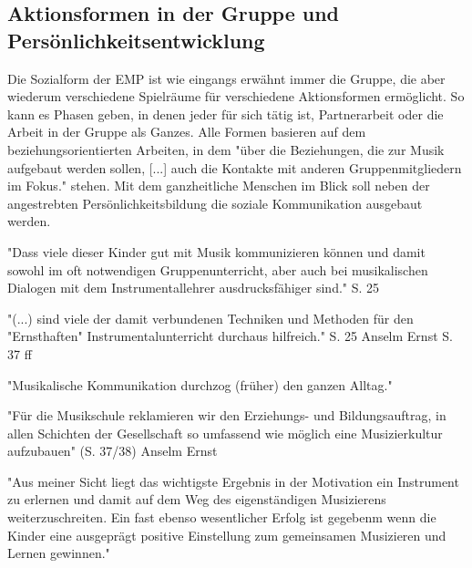 \subsection{Aktionsformen in der Gruppe und Persönlichkeitsentwicklung}
Die Sozialform der EMP ist wie eingangs erwähnt immer die Gruppe, die aber
wiederum verschiedene Spielräume für verschiedene Aktionsformen ermöglicht. So
kann es Phasen geben, in denen jeder für sich tätig ist, Partnerarbeit oder die
Arbeit in der Gruppe als Ganzes. Alle Formen basieren auf dem beziehungsorientierten
Arbeiten, in dem "über die Beziehungen, die zur Musik aufgebaut werden sollen,
[...] auch die Kontakte mit anderen Gruppenmitgliedern im Fokus."
\autocite[10]{dartsch:kern_des_musizierens} stehen. Mit dem ganzheitliche Menschen im
Blick soll neben der angestrebten Persönlichkeitsbildung die soziale
Kommunikation ausgebaut werden.


"Dass viele dieser Kinder gut mit Musik kommunizieren können und damit sowohl im
oft notwendigen Gruppenunterricht, aber auch bei musikalischen Dialogen mit dem
Instrumentallehrer ausdrucksfähiger sind." S. 25

"(...) sind viele der damit verbundenen Techniken und Methoden für den
"Ernsthaften" Instrumentalunterricht durchaus hilfreich." S. 25
Anselm Ernst S. 37 ff

"Musikalische Kommunikation durchzog (früher) den ganzen Alltag."
\autocite[37]{ernst:die_zukunftsfaehige_musikschule}


"Für die Musikschule reklamieren wir den Erziehungs- und Bildungsauftrag, in
allen Schichten der Gesellschaft so umfassend wie möglich eine Musizierkultur
aufzubauen" (S. 37/38) Anselm Ernst

"Aus meiner Sicht liegt das wichtigste Ergebnis in der Motivation ein Instrument
zu erlernen und damit auf dem Weg des eigenständigen Musizierens
weiterzuschreiten. Ein fast ebenso wesentlicher Erfolg ist gegebenm wenn die
Kinder eine ausgeprägt positive Einstellung zum gemeinsamen Musizieren und
Lernen gewinnen." \autocite[40]{ernst:die_zukunftsfaehige_musikschule}

